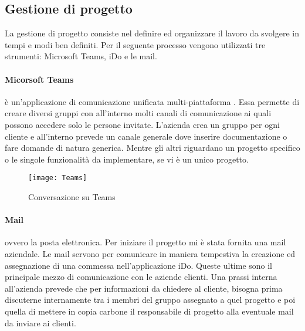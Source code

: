\subsection{Gestione di progetto}
\label{cap1:Gestione di progetto}

La gestione di progetto consiste nel definire ed organizzare il lavoro da svolgere in tempi e modi ben definiti. Per il seguente processo vengono utilizzati tre strumenti: Microsoft Teams, iDo e le mail.

\paragraph{Micorsoft Teams} è un'applicazione di comunicazione unificata multi-piattaforma . Essa permette di creare diversi gruppi con all'interno molti canali di comunicazione ai quali possono accedere solo le persone invitate. L'azienda crea un gruppo per ogni cliente e all'interno prevede un canale generale dove inserire documentazione o fare domande di natura generica. Mentre gli altri riguardano un progetto specifico o le singole funzionalità da implementare, se vi è un unico progetto. 

\begin{figure}[!h] 
	\centering 
	\texttt{[image: Teams]} 
	\caption{Conversazione su Teams}
\end{figure}


\paragraph{Mail} ovvero la posta elettronica. Per iniziare il progetto mi è stata fornita una mail aziendale. Le mail servono per comunicare in maniera tempestiva la creazione ed assegnazione di una commessa nell'applicazione iDo. Queste ultime sono il principale mezzo di comunicazione con le aziende clienti. Una prassi interna all'azienda prevede che per informazioni da chiedere al cliente, bisogna prima discuterne internamente tra i membri del gruppo assegnato a quel progetto e poi quella di mettere in copia carbone il responsabile di progetto alla eventuale mail da inviare ai clienti.




